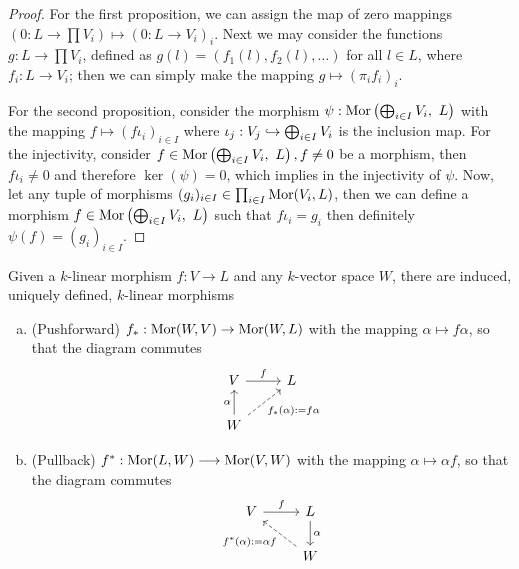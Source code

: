 \begin{proof}
  For the first proposition, we can assign the map of zero mappings \((0 : L \to
  \prod V_i) \longmapsto (0 : L \to V_i)_i\). Next we may consider the functions
  \(g : L \to \prod V_i\), defined as \(g(l) = (f_1(l), f_2(l), \dots)\) for all
  \(l \in L\), where \(f_i : L \to V_i\); then we can simply make the mapping
  \(g \longmapsto (\pi_i  f_i)_i\).

  For the second proposition, consider the morphism \(\psi : \operatorname{Mor}\left(
  \bigoplus_{i \in I} V_i,\ L \right) \) with the mapping \(f \mapsto (f
  \iota_i)_{i \in I}\) where \(\iota_j: V_j \hookrightarrow \bigoplus_{i \in
  I} V_i\) is the inclusion map. For the injectivity, consider \(f \in
  \operatorname{Mor}\left( \bigoplus_{i \in I} V_i,\ L \right), f \neq 0\) be a morphism,
  then \(f  \iota_i \neq 0\) and therefore \(\ker(\psi) = 0\), which
  implies in the injectivity of \(\psi\). Now, let any tuple of morphisms
  \((g_i)_{i \in I} \in \prod_{i \in I} \operatorname{Mor}(V_i, L)\), then we can define a
  morphism \(f \in \operatorname{Mor}\left( \bigoplus_{i \in I} V_i,\ L \right)\) such that
  \(f  \iota_i = g_i\) then definitely \(\psi(f) = (g_i)_{i \in I}\).
\end{proof}

\begin{definition}
  Given a \(k\)-linear morphism \(f : V \to L\) and any \(k\)-vector space
  \(W\), there are induced, uniquely defined, \(k\)-linear morphisms
  \begin{enumerate}[(a)]
    \item (Pushforward) \(f_\ast : \operatorname{Mor}(W, V) \to \operatorname{Mor}(W, L)\) with the mapping
      \(\alpha \mapsto f  \alpha\), so that the diagram commutes
      \[
        \begin{tikzcd}
          V \ar[r, "f"]
            &L \\
          W \ar[u, "\alpha"]
          \ar[ur, dashed, swap, "f_\ast(\alpha) := f  \alpha"]
        \end{tikzcd}
      \]
    \item (Pullback) \(f^\ast : \operatorname{Mor}(L, W) \longrightarrow \operatorname{Mor}(V, W)\) with
      the mapping \(\alpha \longmapsto \alpha  f\), so that the diagram
      commutes
      \[
        \begin{tikzcd}
          V \ar[r, "f"]
            &L \ar[d, "\alpha"] \\
            &W \ar[ul, dashed, "f^\ast(\alpha) := \alpha  f"]
        \end{tikzcd}
      \]
  \end{enumerate}
\end{definition}

